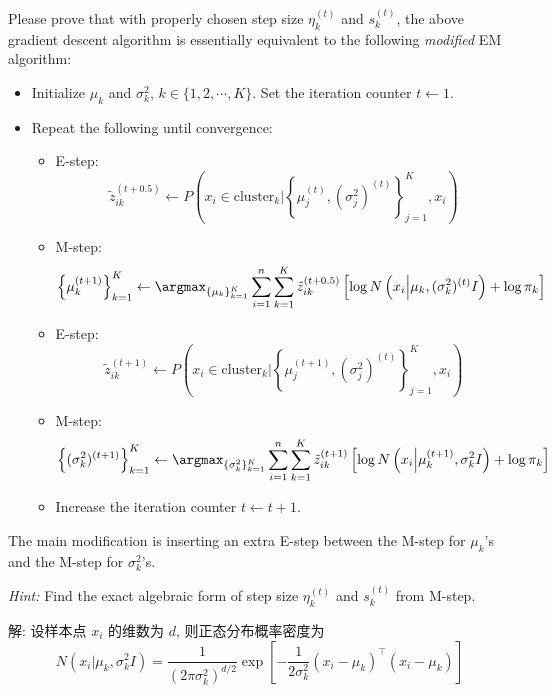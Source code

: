 \documentclass[openany]{ctexbook}
\theoremstyle{kaiti}
\theoremstyle{normal}
\begin{document}
Please prove that with properly chosen step size $\eta_k^{(t)}$ and $s_k^{(t)}$, the above gradient descent algorithm is essentially equivalent to the following \emph{modified} EM algorithm:
\begin{itemize}
	\item Initialize $\mu_k$ and $\sigma_k^2$, $k \in \{1,2,\cdots ,K\}$. Set the iteration counter $t\leftarrow1$.
	\item Repeat the following until convergence:
	\begin{itemize}
		\item E-step:
      \begin{equation}
        \tilde{z}_{ik}^{(t+0.5)} \leftarrow P\left(x_i\in \mathrm{cluster}_k \Big| \left\{\mu_j^{(t)},(\sigma_j^2)^{(t)}\right\}_{j=1}^K,x_i\right)
      \end{equation}
		\item M-step:
      \begin{equation}
        \left\{\mu_k^{(t+1)}\right\}_{k=1}^K \leftarrow \argmax_{\{\mu_k\}_{k=1}^K} \sum_{i=1}^n\sum_{k=1}^K \tilde{z}_{ik}^{(t+0.5)} \left[\log N\left(x_i\Big|\mu_k,(\sigma_k^2)^{(t)}I\right)+\log\pi_k\right]
      \end{equation}
		\item E-step:
      \begin{equation}
        \tilde{z}_{ik}^{(t+1)} \leftarrow P\left(x_i \in \mathrm{cluster}_k \Big| \left\{\mu_j^{(t+1)},(\sigma_j^2)^{(t)}\right\}_{j=1}^K,x_i\right)
      \end{equation}
		\item M-step:
      \begin{equation}
        \left\{(\sigma_k^2)^{(t+1)}\right\}_{k=1}^K \leftarrow \argmax_{\{\sigma_k^2\}_{k=1}^K} \sum_{i=1}^n \sum_{k=1}^K \tilde{z}_{ik}^{(t+1)} \left[\log N\left(x_i\Big|\mu_k^{(t+1)},\sigma_k^2I\right)+\log \pi_k \right]
      \end{equation}
		\item Increase the iteration counter $t\leftarrow t+1$.
	\end{itemize}
\end{itemize}

The main modification is inserting an extra E-step between the M-step for $\mu_k$'s and the M-step for $\sigma_k^2$'s.

\emph{Hint:} Find the exact algebraic form of step size $\eta_k^{(t)}$ and $s_k^{(t)}$ from M-step.

解: 设样本点 $x_i$ 的维数为 $d$, 则正态分布概率密度为
\begin{equation}
  N(x_i|\mu_k,\sigma_k^2I)=\frac{1}{(2\pi\sigma_k^2)^{d/2}}\exp\left[-\frac{1}{2\sigma_k^2}(x_i-\mu_k)^{\top}(x_i-\mu_k)\right]
\end{equation}
\end{document}
